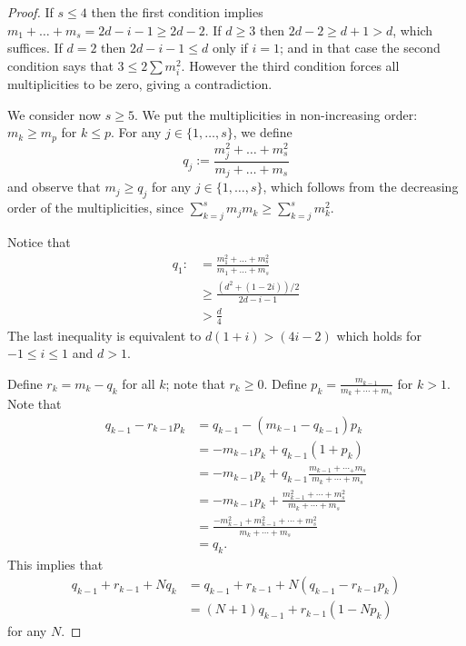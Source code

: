 \documentclass[12pt]{article}
\numberwithin{equation}{section}
\numberwithin{equation}{section}
\numberwithin{subeq}{equation}
\begin{document}
\begin{proof}
If $s \leq 4$ then the first condition implies 
$m_1+\ldots+m_s=2d-i-1 \geq 2d-2$.
If $d \geq 3$ then $2d-2 \geq d+1 > d$, which suffices.
If $d=2$ then $2d-i-1 \leq d$ only if $i=1$;
and in that case the second condition says that $3 \leq 2\sum m_i^2$.
However the third condition forces all multiplicities to be zero, giving a contradiction.

We consider now $s\geq 5$. 
 We put the multiplicities in non-increasing order: 
$m_k \geq m_p$ for $k\leq p$.
For any $j\in \{1, \ldots, s\}$,  we define
\[
q_j:=\frac{m_j^2+\ldots+ m_s^2}{m_j+\ldots +m_s}
\]
and observe that $m_j \geq q_j$  for any $j\in \{1, \ldots, s\}$,
which follows from the decreasing order of the multiplicities,
since  $\sum_{k=j}^{s} m_j  m_k\geq \sum_{k=j}^s m_k^2$.

Notice that
\begin{equation}\label{eq3}
\begin{split}
 q_1: &= \frac{m_1^2+\ldots+ m_s^2}{m_1+\ldots +m_s} \\
 &\geq \frac{(d^2+(1-2i))/2}{2d-i-1} \\
 &> \frac{d}{4}
\end{split}
\end{equation}
The last inequality is equivalent to $d(1+i) > (4i-2)$ which holds for $-1 \leq i\leq 1$ and $d>1$. 
	
	

Define $r_k = m_k-q_k$ for all $k$; note that $r_k \geq 0$.
Define $p_k = \frac{m_{k-1}}{m_k+\cdots + m_s}$ for $k >1$.
Note that
\begin{equation}\label{eq2}
\begin{split}
q_{k-1}-r_{k-1}p_k
	&=q_{k-1} -(m_{k-1}-q_{k-1})p_k \\
	&= -m_{k-1}p_k + q_{k-1}(1 + p_k) \\
	&=  -m_{k-1}p_k + q_{k-1}\frac{m_{k-1}+\cdots _+ m_s}{m_k+\cdots + m_s} \\
	&= -m_{k-1}p_k + \frac{m_{k-1}^2 +\cdots + m_s^2}{m_k+\cdots + m_s} \\
	&= \frac{-m_{k-1}^2+m_{k-1}^2 +\cdots + m_s^2}{m_k+\cdots + m_s} \\
&= q_k.
\end{split}
\end{equation}
This implies that
\begin{equation}\label{eq4}
\begin{split}
q_{k-1}+r_{k-1}+ N q _k &= q_{k-1}+r_{k-1} + N(q_{k-1}-r_{k-1}p_k) \\
&= (N+1)q_{k-1} + r_{k-1}(1-Np_k)
\end{split}
\end{equation}
for any $N$.


\end{proof}
\end{document}
